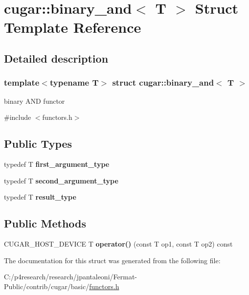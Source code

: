 \hypertarget{structcugar_1_1binary__and}{}\section{cugar\+:\+:binary\+\_\+and$<$ T $>$ Struct Template Reference}
\label{structcugar_1_1binary__and}


\subsection{Detailed description}
\subsubsection*{template$<$typename T$>$\newline
struct cugar\+::binary\+\_\+and$<$ T $>$}

binary A\+ND functor 

{\ttfamily \#include $<$functors.\+h$>$}

\subsection*{Public Types}
\begin{DoxyCompactItemize}
\item 
\mbox{\label{structcugar_1_1binary__and_a1e30551179517b926f4f6491779f292d}} 
typedef T {\bfseries first\+\_\+argument\+\_\+type}
\item 
\mbox{\label{structcugar_1_1binary__and_ac50c8f34215b539d8292b0ff091c7f7a}} 
typedef T {\bfseries second\+\_\+argument\+\_\+type}
\item 
\mbox{\label{structcugar_1_1binary__and_a8cc024089ca431e3bdca09d78bb4799c}} 
typedef T {\bfseries result\+\_\+type}
\end{DoxyCompactItemize}
\subsection*{Public Methods}
\begin{DoxyCompactItemize}
\item 
\mbox{\label{structcugar_1_1binary__and_a4d8efd56da4ca28be2ecb4f56b8440ae}} 
C\+U\+G\+A\+R\+\_\+\+H\+O\+S\+T\+\_\+\+D\+E\+V\+I\+CE T {\bfseries operator()} (const T op1, const T op2) const
\end{DoxyCompactItemize}


The documentation for this struct was generated from the following file\+:\begin{DoxyCompactItemize}
\item 
C\+:/p4research/research/jpantaleoni/\+Fermat-\/\+Public/contrib/cugar/basic/\hyperlink{functors_8h}{functors.\+h}\end{DoxyCompactItemize}
